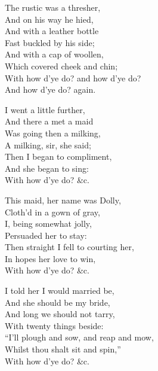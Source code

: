 \settowidth{\versewidth}{With how d’ye do? and how d’ye do?}
\begin{dcverse}\begin{altverse}
The rustic was a thresher,\\
And on his way he hied,\\
And with a leather bottle\\
Fast buckled by his side;\\
And with a cap of woollen,\\
Which covered cheek and chin;\\
With how d’ye do? and how d’ye do?\\
And how d’ye do? again.
\end{altverse}

\begin{altverse}
I went a little further,\\
And there a met a maid\\
Was going then a milking,\\
A milking, sir, she said;\\
Then I began to compliment,\\
And she began to sing:\\
With how d’ye do? \&c.
\end{altverse}

\begin{altverse}
This maid, her name was Dolly,\\
Cloth’d in a gown of gray,\\
I, being somewhat jolly,\\
Persuaded her to stay:\\
Then straight I fell to courting her,\\
In hopes her love to win,\\
With how d’ye do? \&c.
\end{altverse}

\begin{altverse}
I told her I would married be,\\
And she should be my bride,\\
And long we should not tarry,\\
With twenty things beside:\\
“I’ll plough and sow, and reap and mow,\\
Whilst thou shalt sit and spin,”\\
With how d’ye do? \&c.
\end{altverse}
\end{dcverse}
\pagebreak


